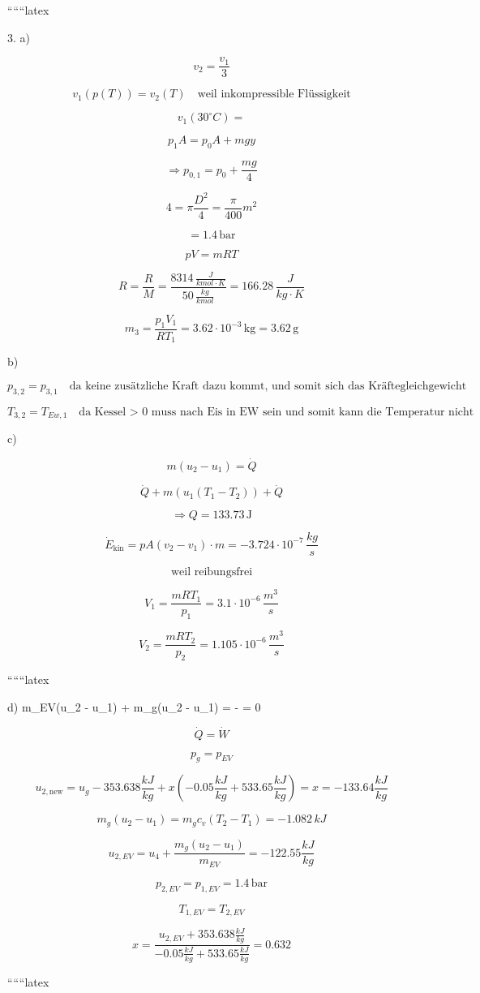 
``````latex


3. a)

\[
v_2 = \frac{v_1}{3}
\]

\[
v_1 (p(T)) = v_2 (T) \quad \text{weil inkompressible Flüssigkeit}
\]

\[
v_1 (30^\circ C) = 
\]

\[
p_1 A = p_0 A + m g y
\]

\[
\Rightarrow p_{0,1} = p_0 + \frac{m g}{4}
\]

\[
4 = \pi \frac{D^2}{4} = \frac{\pi}{400} m^2
\]

\[
= 1.4 \, \text{bar}
\]

\[
pV = mRT
\]

\[
R = \frac{R}{M} = \frac{8314 \, \frac{J}{kmol \cdot K}}{50 \, \frac{kg}{kmol}} = 166.28 \, \frac{J}{kg \cdot K}
\]

\[
m_3 = \frac{p_1 V_1}{R T_1} = 3.62 \cdot 10^{-3} \, \text{kg} = 3.62 \, \text{g}
\]

b)

\[
p_{3,2} = p_{3,1} \quad \text{da keine zusätzliche Kraft dazu kommt, und somit sich das Kräftegleichgewicht nicht ändert}
\]

\[
T_{3,2} = T_{Ew,1} \quad \text{da Kessel > 0 muss nach Eis in EW sein und somit kann die Temperatur nicht ansteigen, da das Gas in EW im thermodynamischen GGW sind, müssen die Temperaturen gleich sein}
\]

c)

\[
m (u_2 - u_1) = \dot{Q}
\]

\[
\dot{Q} + m (u_1 (T_1 - T_2)) + \dot{Q}
\]

\[
\Rightarrow Q = 133.73 \, \text{J}
\]

\[
\dot{E}_{\text{kin}} = pA (v_2 - v_1) \cdot m = -3.724 \cdot 10^{-7} \, \frac{kg}{s}
\]

\[
\text{weil reibungsfrei}
\]

\[
V_1 = \frac{mRT_1}{p_1} = 3.1 \cdot 10^{-6} \, \frac{m^3}{s}
\]

\[
V_2 = \frac{mRT_2}{p_2} = 1.105 \cdot 10^{-6} \, \frac{m^3}{s}
\]

``````latex


d) \quad m_{EV}(u_2 - u_1) + m_g(u_2 - u_1) =  -  = 0

\[
\dot{Q} = \dot{W}
\]

\[
p_g = p_{EV}
\]

\[
u_{2, \text{new}} = u_g - 353.638 \frac{kJ}{kg} + x \left( -0.05 \frac{kJ}{kg} + 533.65 \frac{kJ}{kg} \right) = x = -133.64 \frac{kJ}{kg}
\]

\[
m_g(u_2 - u_1) = m_g c_v (T_2 - T_1) = -1.082 \, kJ
\]

\[
u_{2, EV} = u_4 + \frac{m_g (u_2 - u_1)}{m_{EV}} = -122.55 \frac{kJ}{kg}
\]

\[
p_{2, EV} = p_{1, EV} = 1.4 \, \text{bar}
\]

\[
T_{1, EV} = T_{2, EV}
\]

\[
x = \frac{u_{2, EV} + 353.638 \frac{kJ}{kg}}{-0.05 \frac{kJ}{kg} + 533.65 \frac{kJ}{kg}} = 0.632
\]

``````latex


